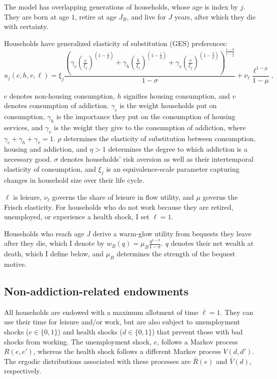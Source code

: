 \documentclass[parskip=full]{article}
\begin{document}
The model has overlapping generations of households, whose age is index by $j$. They are born at age $1$, retire at age $J_R$, and live for $J$ years, after which they die with certainty. 

Households have generalized elasticity of substitution (GES) preferences: 
\begin{equation}
    u_j(c,h,v,\ell)=\xi_{j}\frac{\left(\gamma_{c} \left(\frac{c}{\xi_{j}}\right)^{\left(1-\frac{1}{\rho}\right)} + \gamma_h \left(\frac{h}{\xi_{j}}\right)^{\left(1-\frac{1}{\rho}\right)} + \gamma_{v} \left(\frac{v}{\xi_{j}}\right)^{\left(1-\frac{\eta}{\rho}\right)} \right)^{\frac{1-\sigma}{1-\frac{1}{\rho}}}}{1-\sigma} + \nu_{\ell}\frac{\ell^{1-\mu}}{1-\mu},
\end{equation}

\noindent $c$ denotes non-housing consumption, $h$ signifies housing consumption, and $v$ denotes consumption of addiction. $\gamma_c$ is the weight households put on consumption, $\gamma_h$ is the importance they put on the consumption of housing services, and $\gamma_{v}$ is the weight they give to the consumption of addiction, where $\gamma_c+\gamma_h+\gamma_{v}=1$. $\rho$ determines the elasticity of substitution between consumption, housing and addiction, and $\eta>1$ determines the degree to which addiction is a necessary good. $\sigma$ denotes households' risk aversion as well as their intertemporal elasticity of consumption, and $\xi_j$ is an equivalence-scale parameter capturing changes in household size over their life cycle.

$\ell$ is leisure, $\nu_{\ell}$ governs the share of leisure in flow utility, and $\mu$ governs the Frisch elasticity. For households who do not work because they are retired, unemployed, or experience a health shock, I set $\ell=1$.

Households who reach age $J$ derive a warm-glow utility from bequests they leave after they die, which I denote by $w_B(q)=\mu_{B} \frac{q^{1-\sigma}}{1-\sigma}$. $q$ denotes their net wealth at death, which I define below, and $\mu_{B}$ determines the strength of the bequest motive.

\subsection{Non-addiction-related endowments}\label{sec:non_addiction_endowments}
All households are endowed with a maximum allotment of time $\overline{\ell}=1$. They can use their time for leisure and/or work, but are also subject to unemployment shocks ($e \in \{0,1\}$) and health shocks ($d \in \{0,1\}$) that prevent those with bad shocks from working. The unemployment shock, $e$, follows a Markov process $R(e,e')$, whereas the health shock follows a different Markov process $V(d,d')$. The ergodic distributions associated with these processes are $\bar{R}(e)$ and $\bar{V}(d)$, respectively.
\end{document}
